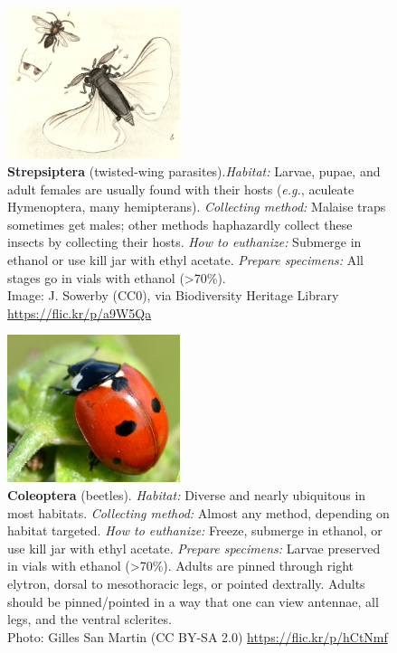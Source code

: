 \documentclass[letterpaper, 11pt]{article}
\begin{document}
\clearpage

\begin{figure}
  \caption*{\textbf{Strepsiptera} (twisted-wing parasites).\textit{Habitat:} Larvae, pupae, and adult females are usually found with their hosts (\textit{e.g.}, aculeate Hymenoptera, many hemipterans). \textit{Collecting method:} Malaise traps sometimes get males; other methods haphazardly collect these insects by collecting their hosts. \textit{How to euthanize:} Submerge in ethanol or use kill jar with ethyl acetate. \textit{Prepare specimens:} All stages go in vials with ethanol (\textgreater70\%). \\ Image: J. Sowerby (CC0), via Biodiversity Heritage Library \url{https://flic.kr/p/a9W5Qa}}
  \includegraphics[width=0.45\textwidth]{Strepsiptera}
\end{figure}

\begin{figure}
  \caption*{\textbf{Coleoptera} (beetles). 
  \textit{Habitat:} Diverse and nearly ubiquitous in most habitats. \textit{Collecting method:} Almost any method, depending on habitat targeted. \textit{How to euthanize:} Freeze, submerge in ethanol, or use kill jar with ethyl acetate. \textit{Prepare specimens:} Larvae preserved in vials with ethanol (\textgreater70\%). Adults are pinned through right elytron, dorsal to mesothoracic legs, or pointed dextrally. Adults should be pinned/pointed in a way that one can view antennae, all legs, and the ventral sclerites. \\ Photo: Gilles San Martin (CC BY-SA 2.0) \url{https://flic.kr/p/hCtNmf}}
  \includegraphics[width=0.45\textwidth]{Coleoptera}
\end{figure}
\end{document}
